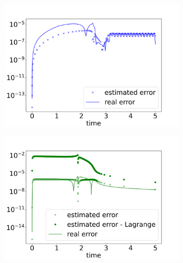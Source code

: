\begin{figure}[H]
    \centering
    \begin{subfigure}{0.32\textwidth}
    	\centering
    	\includegraphics[width=1\textwidth]{images/errorEstimateRKF45.png}
        \label{fig:errorEstimateEvolutionRKF45}
    \end{subfigure}
    \begin{subfigure}{0.32\textwidth}
    	\centering
    	\includegraphics[width=1\textwidth]{images/errorEstimateBDF12.png}
        \label{fig:errorEstimateEvolutionBDF12}
    \end{subfigure}
    \begin{subfigure}{0.32\textwidth}
    	\centering

\end{subfigure}
\end{figure}
